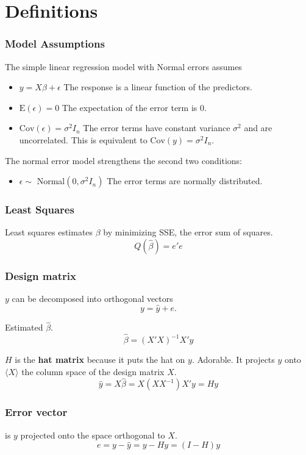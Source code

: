 \documentclass[12pt]{article}
\newcommand{\E}{\mathrm{E}}
\newcommand{\Cov}{\mathrm{Cov}}
\begin{document}
\section{Definitions}

\subsubsection{Model Assumptions}

The simple linear regression model with Normal errors assumes
\begin{itemize}
    \item $y = X \beta + \epsilon$ The response is a linear function of the predictors.
    \item $\E(\epsilon) = 0$ The expectation of the error term is 0.
    \item $\Cov(\epsilon) = \sigma^2 I_n$ The error terms have constant
variance $\sigma^2$ and are uncorrelated. This is equivalent to
$\Cov(y) = \sigma^2 I_n$.
\end{itemize}

The normal error model strengthens the second two conditions:
\begin{itemize}
    \item $\epsilon \sim $ Normal$(0, \sigma^2 I_n)$ The error terms are
normally distributed.
\end{itemize}

\subsubsection{Least Squares}

Least squares estimates $\beta$ by minimizing SSE, the error sum of
squares.
\[
    Q(\hat{\beta}) = e'e
\]

\subsubsection{Design matrix}

$y$ can be decomposed into orthogonal vectors
\[
    y = \hat{y} + e.
\]

Estimated $\hat{\beta}$.
\[
    \hat{\beta} = (X'X)^{-1}X'y
\]

$H$ is the \textbf{hat matrix} because it puts the hat on $y$. Adorable. It projects
$y$ onto $\langle X \rangle$ the column space of the design matrix $X$.
\[
    \hat{y} = X \hat{\beta} = X(X X^{-1})X'y = Hy
\]

\subsubsection{Error vector} is $y$ projected onto the space orthogonal to $X$.
\[
    e = y - \hat{y} = y - Hy = (I - H)y
\]
\end{document}
